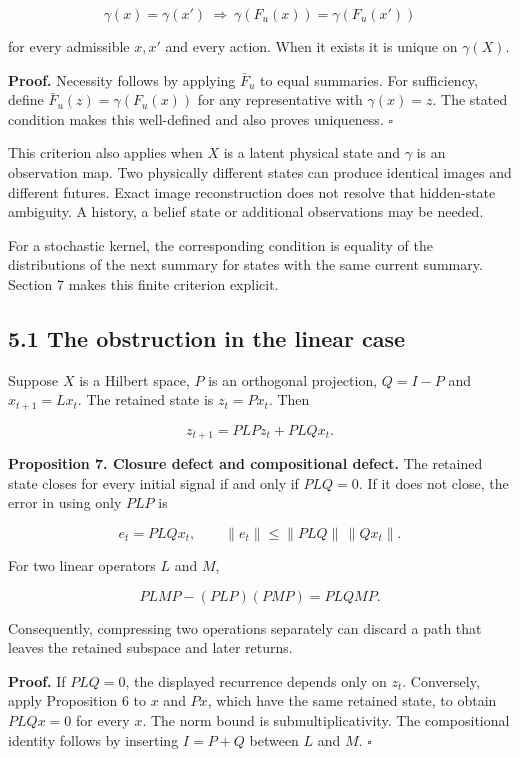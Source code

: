 \[
\gamma(x)=\gamma(x')\ \Longrightarrow\
\gamma(F_u(x))=\gamma(F_u(x'))
\]

for every admissible \(x,x'\) and every action. When it exists it is
unique on \(\gamma(X)\).

\textbf{Proof.} Necessity follows by applying \(\bar F_u\) to equal
summaries. For sufficiency, define \(\bar F_u(z)=\gamma(F_u(x))\) for
any representative with \(\gamma(x)=z\). The stated condition makes this
well-defined and also proves uniqueness. \(\square\)

This criterion also applies when \(X\) is a latent physical state and
\(\gamma\) is an observation map. Two physically different states can
produce identical images and different futures. Exact image
reconstruction does not resolve that hidden-state ambiguity. A history,
a belief state or additional observations may be needed.

For a stochastic kernel, the corresponding condition is equality of the
distributions of the next summary for states with the same current
summary. Section 7 makes this finite criterion explicit.

\subsection{5.1 The obstruction in the linear
case}\label{LSM:the-obstruction-in-the-linear-case}

Suppose \(X\) is a Hilbert space, \(P\) is an orthogonal projection,
\(Q=I-P\) and \(x_{t+1}=Lx_t\). The retained state is \(z_t=Px_t\). Then

\[
z_{t+1}=PLPz_t+PLQx_t.
\]

\textbf{Proposition 7. Closure defect and compositional defect.} The
retained state closes for every initial signal if and only if \(PLQ=0\).
If it does not close, the error in using only \(PLP\) is

\[
e_t=PLQx_t,\qquad
\|e_t\|\leq\|PLQ\|\,\|Qx_t\|.
\]

For two linear operators \(L\) and \(M\),

\[
\boxed{PLMP-(PLP)(PMP)=PLQMP.}
\]

Consequently, compressing two operations separately can discard a path
that leaves the retained subspace and later returns.

\textbf{Proof.} If \(PLQ=0\), the displayed recurrence depends only on
\(z_t\). Conversely, apply Proposition 6 to \(x\) and \(Px\), which have
the same retained state, to obtain \(PLQx=0\) for every \(x\). The norm
bound is submultiplicativity. The compositional identity follows by
inserting \(I=P+Q\) between \(L\) and \(M\). \(\square\)

